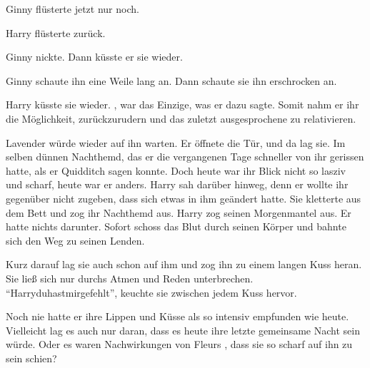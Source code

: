  Ginny flüsterte jetzt nur noch.

Harry flüsterte zurück. 


 Ginny nickte.  Dann küsste er sie wieder. 



Ginny schaute ihn eine Weile lang an.  Dann schaute sie ihn erschrocken an.

Harry küsste sie wieder. , war das Einzige, was er dazu sagte. Somit nahm er ihr die Möglichkeit, zurückzurudern und das zuletzt ausgesprochene zu relativieren.

\trenn

Lavender würde wieder auf ihn warten. Er öffnete die Tür, und da lag sie. Im selben dünnen Nachthemd, das er die vergangenen Tage schneller von ihr gerissen hatte, als er Quidditch sagen konnte. Doch heute war ihr Blick nicht so lasziv und scharf, heute war er anders. Harry sah darüber hinweg, denn er wollte ihr gegenüber nicht zugeben, dass sich etwas in ihm geändert hatte. Sie kletterte aus dem Bett und zog ihr Nachthemd aus. Harry zog seinen Morgenmantel aus. Er hatte nichts darunter. Sofort schoss das Blut durch seinen Körper und bahnte sich den Weg zu seinen Lenden.

Kurz darauf lag sie auch schon auf ihm und zog ihn zu einem langen Kuss heran. Sie ließ sich nur durchs Atmen und Reden unterbrechen. \enquote{Harry\abs du\abs hast\abs mir\abs gefehlt}, keuchte sie zwischen jedem Kuss hervor.

Noch nie hatte er ihre Lippen und Küsse als so intensiv empfunden wie heute. Vielleicht lag es auch nur daran, dass es heute ihre letzte gemeinsame Nacht sein würde. Oder es waren Nachwirkungen von Fleurs , dass sie so scharf auf ihn zu sein schien? 

